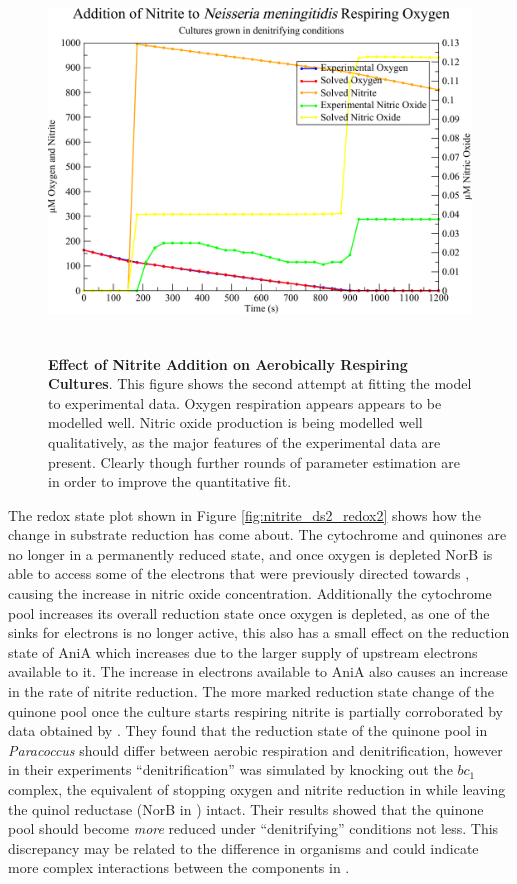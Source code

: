\begin{figure}[tbp]
 \centering
 \includegraphics[height=10cm, clip=true]{./07-nitritereduction/data/dataset2-2.pdf}
 \caption[Effect of Nitrite Addition on Aerobically Respiring Cultures]{{\bf Effect of Nitrite Addition on Aerobically Respiring Cultures}. This figure shows the second attempt at fitting the model to experimental data. Oxygen respiration appears appears to be modelled well. Nitric oxide production is being modelled well qualitatively, as the major features of the experimental data are present. Clearly though further rounds of parameter estimation are in order to improve the quantitative fit.
  \label{fig:nitrite_ds2_solved2}}
\end{figure}

The redox state plot shown in Figure \ref{fig:nitrite_ds2_redox2} shows how the change in substrate reduction has come about. The cytochrome and quinones are no longer in a permanently reduced state, and once oxygen is depleted NorB is able to access some of the electrons that were previously directed towards \cbbthree{}, causing the increase in nitric oxide concentration. Additionally the cytochrome pool increases its overall reduction state once oxygen is depleted, as one of the sinks for electrons is no longer active, this also has a small effect on the reduction state of AniA which increases due to the larger supply of upstream electrons available to it. The increase in electrons available to AniA also causes an increase in the rate of nitrite reduction. The more marked reduction state change of the quinone pool once the culture starts respiring nitrite is partially corroborated by data obtained by \citet{Otten1999}. They found that the reduction state of the quinone pool in \textit{Paracoccus} should 
differ between aerobic respiration and denitrification, however in their experiments ``denitrification'' was simulated by knocking out the $bc_1$ complex, the equivalent of stopping oxygen and nitrite reduction in \Nsm{} while leaving the quinol reductase (NorB in \Nm{}) intact. Their results showed that the quinone pool should become \textit{more} reduced under ``denitrifying'' conditions not less. This discrepancy may be related to the difference in organisms and could indicate more complex interactions between the components in \Nsm{}.

